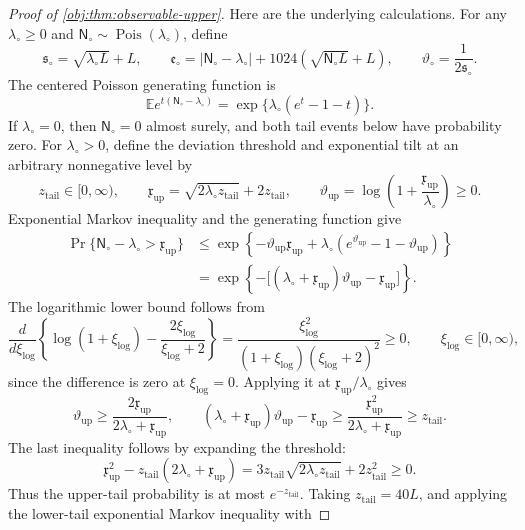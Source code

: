 \begin{proof}[Proof of \cref{obj:thm:observable-upper}]
Here are the underlying calculations. For any
\(\lambda_\circ\ge0\) and
\(\mathsf N_\circ\sim\operatorname{Pois}(\lambda_\circ)\), define
\[
\mathfrak s_\circ=\sqrt{\lambda_\circ L}+L,\qquad
\mathfrak e_\circ
=
|\mathsf N_\circ-\lambda_\circ|
+1024\left(\sqrt{\mathsf N_\circ L}+L\right),
\qquad
\vartheta_\circ=\frac1{2\mathfrak s_\circ}.
\]
The centered Poisson generating function is
\[
\mathbb E e^{t(\mathsf N_\circ-\lambda_\circ)}
=
\exp\{\lambda_\circ(e^t-1-t)\}.
\]
If \(\lambda_\circ=0\), then \(\mathsf N_\circ=0\) almost surely, and both tail events below have probability zero. For \(\lambda_\circ>0\), define the deviation threshold and exponential tilt at an arbitrary nonnegative level by
\[
z_{\mathrm{tail}}\in[0,\infty),\qquad
\mathfrak x_{\mathrm{up}}
=\sqrt{2\lambda_\circ z_{\mathrm{tail}}}+2z_{\mathrm{tail}},
\qquad
\vartheta_{\mathrm{up}}
=\log\left(1+\frac{\mathfrak x_{\mathrm{up}}}{\lambda_\circ}\right)\ge0.
\]
Exponential Markov inequality and the generating function give
\[
\begin{aligned}
\Pr\{\mathsf N_\circ-\lambda_\circ>\mathfrak x_{\mathrm{up}}\}
&\le
\exp\left\{
-\vartheta_{\mathrm{up}}\mathfrak x_{\mathrm{up}}
+\lambda_\circ(e^{\vartheta_{\mathrm{up}}}-1-\vartheta_{\mathrm{up}})
\right\}\\
&=
\exp\left\{
-\bigl[(\lambda_\circ+\mathfrak x_{\mathrm{up}})
\vartheta_{\mathrm{up}}-\mathfrak x_{\mathrm{up}}\bigr]
\right\}.
\end{aligned}
\]
The logarithmic lower bound follows from
\[
\frac{d}{d\xi_{\mathrm{log}}}
\left\{\log(1+\xi_{\mathrm{log}})
-\frac{2\xi_{\mathrm{log}}}{\xi_{\mathrm{log}}+2}\right\}
=
\frac{\xi_{\mathrm{log}}^2}
{(1+\xi_{\mathrm{log}})(\xi_{\mathrm{log}}+2)^2}
\ge0,
\qquad \xi_{\mathrm{log}}\in[0,\infty),
\]
since the difference is zero at \(\xi_{\mathrm{log}}=0\). Applying it at \(\mathfrak x_{\mathrm{up}}/\lambda_\circ\) gives
\[
\vartheta_{\mathrm{up}}
\ge\frac{2\mathfrak x_{\mathrm{up}}}{2\lambda_\circ+\mathfrak x_{\mathrm{up}}},
\qquad
(\lambda_\circ+\mathfrak x_{\mathrm{up}})\vartheta_{\mathrm{up}}
-\mathfrak x_{\mathrm{up}}
\ge
\frac{\mathfrak x_{\mathrm{up}}^2}
{2\lambda_\circ+\mathfrak x_{\mathrm{up}}}
\ge z_{\mathrm{tail}}.
\]
The last inequality follows by expanding the threshold:
\[
\mathfrak x_{\mathrm{up}}^2
-z_{\mathrm{tail}}(2\lambda_\circ+\mathfrak x_{\mathrm{up}})
=
3z_{\mathrm{tail}}\sqrt{2\lambda_\circ z_{\mathrm{tail}}}
+2z_{\mathrm{tail}}^2\ge0.
\]
Thus the upper-tail probability is at most \(e^{-z_{\mathrm{tail}}}\). Taking \(z_{\mathrm{tail}}=40L\), and applying the lower-tail exponential Markov inequality with

\end{proof}

